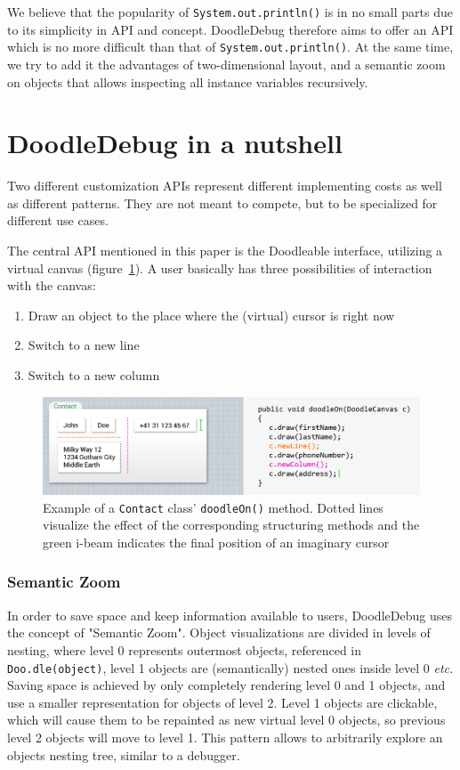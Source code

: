 \documentclass[english]{acm_proc_article-sp}
\newcommand\meta[1]{\nbc{META}{#1}{purple}}
\begin{document}
We believe that the popularity of \verb-System.out.println()- is in no small parts due to its simplicity in API and concept. DoodleDebug therefore aims to offer an API which is no more difficult than that of \verb-System.out.println()-. At the same time, we try to add it the advantages of two-dimensional layout, and a semantic zoom on objects that allows inspecting all instance variables recursively.

\section{DoodleDebug in a nutshell}
Two different customization APIs represent different implementing costs as well as different patterns. They are not meant to compete, but to be specialized for different use cases.

The central API mentioned in this paper is the Doodleable interface, utilizing a virtual canvas (figure~\ref{canvas-illustration}). A user basically has three possibilities of interaction with the canvas:
\begin{enumerate}
\item Draw an object to the place where the (virtual) cursor is right now
\item Switch to a new line
\item Switch to a new column
\end{enumerate}

\begin{figure}[h]
	\includegraphics[width=\linewidth]{img/doodleable-example.png}
	\caption[Usage of the Doodleable interface]{Example of a \texttt{Contact} class' \texttt{doodleOn()} method. Dotted lines visualize the effect of the corresponding structuring methods and the green i-beam indicates the final position of an imaginary cursor}
	\meta{Can I make this wider?}
	\label{canvas-illustration}
\end{figure}

\subsubsection{Semantic Zoom}
In order to save space and keep information available to users, DoodleDebug uses the concept of "Semantic Zoom"\cite{semantic-zoom}.
Object visualizations are divided in levels of nesting, where level 0 represents outermost objects, referenced in \verb-Doo.dle(object)-, level 1 objects are (semantically) nested ones inside level 0 \emph{etc.} Saving space is achieved by only completely rendering level 0 and 1 objects, and use a smaller representation for objects of level 2. Level 1 objects are clickable, which will cause them to be repainted as new virtual level 0 objects, so previous level 2 objects will move to level 1. This pattern allows to arbitrarily explore an objects nesting tree, similar to a debugger.
\end{document}
